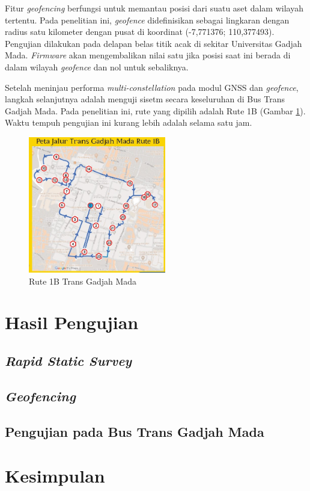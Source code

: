 \documentclass[conference]{IEEEtran}
\begin{document}
Fitur \textit{geofencing} berfungsi untuk memantau posisi dari suatu aset dalam wilayah tertentu. Pada penelitian ini, \textit{geofence} didefinisikan sebagai lingkaran dengan radius satu kilometer dengan pusat di koordinat (-7,771376; 110,377493). Pengujian dilakukan pada delapan belas titik acak di sekitar Universitas Gadjah Mada. \textit{Firmware} akan mengembalikan nilai satu jika posisi saat ini berada di dalam wilayah \textit{geofence} dan nol untuk sebaliknya.

Setelah meninjau performa \textit{multi-constellation} pada modul GNSS dan \textit{geofence}, langkah selanjutnya adalah menguji sisetm secara keseluruhan di Bus Trans Gadjah Mada. Pada penelitian ini, rute yang dipilih adalah Rute 1B (Gambar \ref{fig: tgm-1b}). Waktu tempuh pengujian ini kurang lebih adalah selama satu jam.

\begin{figure}[hbt!]
	\centering
	\includegraphics[width=6cm]{Peta-Jalur-Rute-1B.jpg}
	\caption{Rute 1B Trans Gadjah Mada}
	\label{fig: tgm-1b}
\end{figure}

\section{Hasil Pengujian}
\subsection{\textit{Rapid Static Survey}}
\subsection{\textit{Geofencing}}
\subsection{Pengujian pada Bus Trans Gadjah Mada}

\section{Kesimpulan}
\end{document}
